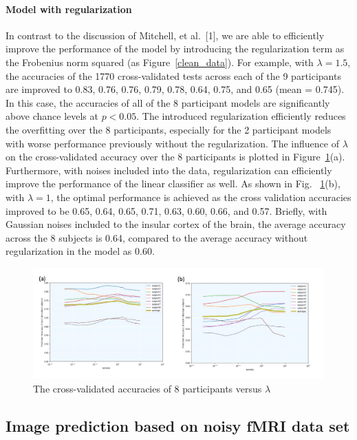 \documentclass{article}
\begin{document}
\paragraph{Model with regularization}
In contrast to the discussion of Mitchell, et al.\ [1], we are able to efficiently improve the performance of the model by introducing the regularization term as the Frobenius norm squared (as Figure~\ref{clean_data}). For example, with $\lambda=1.5$, the accuracies of the 1770 cross-validated tests across each of the 9 participants are improved to 0.83, 0.76, 0.76, 0.79, 0.78, 0.64, 0.75, and 0.65 (mean = 0.745). In this case, the accuracies of all of the 8 participant models are significantly above chance levels at $p<0.05$. The introduced regularization efficiently reduces the overfitting over the 8 participants, especially for the 2 participant models with worse performance previously without the regularization. The influence of $\lambda$ on the cross-validated accuracy over the 8 participants is plotted in Figure~\ref{figure1}(a). 
Furthermore, with noises included into the data, regularization can efficiently improve the performance of the linear classifier as well. As shown in Fig. ~\ref{figure1}(b), with $\lambda=1$, the optimal performance is achieved as the cross validation accuracies improved to be 0.65, 0.64, 0.65, 0.71, 0.63, 0.60, 0.66, and 0.57. Briefly, with Gaussian noises included to the insular cortex of the brain, the average accuracy across the 8 subjects is 0.64, compared to the average accuracy without regularization in the model as 0.60. 

\begin{figure}
\centering
\includegraphics[scale=0.2]{figure1}
\caption{The cross-validated accuracies of 8 participants versus $\lambda$}
\label{figure1}
\end{figure}


\subsection{Image prediction based on noisy fMRI data set}
\end{document}
